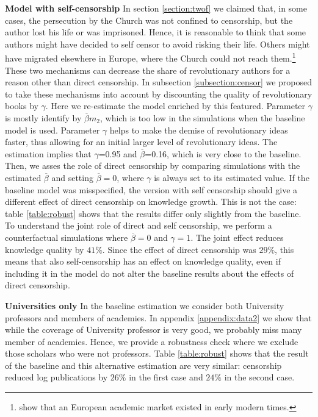 
\textbf{Model with self-censorship} In section \ref{section:twof} we claimed that, in some cases, the persecution by the Church was not confined to censorship, but the author lost his life or was imprisoned. Hence, it is reasonable to think that some authors might have decided to self censor to avoid risking their life. Others might have migrated elsewhere in Europe, where the Church could not reach them.\footnote{ show that an European academic market existed in early modern times.} These two mechanisms can decrease the share of revolutionary authors for a reason other than direct censorship. In subsection \ref{subsection:censor} we proposed to take these mechanisms into account by discounting the quality of revolutionary books by $\gamma$. Here we re-estimate the model enriched by this featured. Parameter $\gamma$ is mostly identify by $\overline{\beta}m_2$, which is too low in the simulations when the baseline model is used. Parameter $\gamma$ helps to make the demise of revolutionary ideas faster, thus allowing for an initial larger level of revolutionary ideas. The estimation implies that $\gamma$=0.95 and $\overline{\beta}$=0.16, which is very close to the baseline. Then, we asses the role of direct censorship by comparing simulations with the estimated $\overline{\beta}$ and setting $\overline{\beta}=0$, where $\gamma$ is always set to its estimated value. If the baseline model was misspecified, the version with self censorship should give a different effect of direct censorship on knowledge growth. This is not the case: table \ref{table:robust} shows that the results differ only slightly from the baseline. To understand the joint role of direct and self censorship, we perform a counterfactual simulations where $\overline{\beta}=0$ and $\gamma=1$. The joint effect reduces knowledge quality by $41\%$. Since the effect of direct censorship was $29\%$, this means that also self-censorship has an effect on knowledge quality, even if including it in the model do not alter the baseline results about the effects of direct censorship.

\textbf{Universities only} In the baseline estimation we consider both University professors and members of academies. In appendix \ref{appendix:data2} we show that while the coverage of University professor is very good, we probably miss many member of academies. Hence, we provide a robustness check where we exclude those scholars who were not professors. Table \ref{table:robust} shows that the result of the baseline and this alternative estimation are very similar: censorship reduced log publications by $26\%$ in the first case and $24\%$ in the second case.
	

